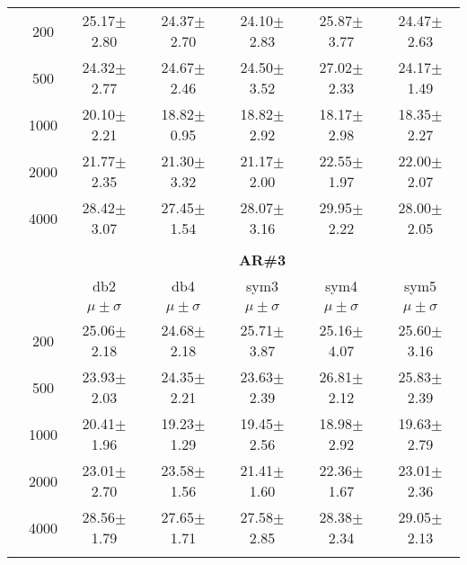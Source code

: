 \begin{table}[H]
\begin{tabular}{|c|c|c c c c c|}
\multicolumn{1}{|c|}{ \multirow{5}{*}{\rotatebox[origin=c]{90}{\textbf{Neurônios}}} }
&200	&25.17$\pm$2.80	&24.37$\pm$2.70	&24.10$\pm$2.83	&25.87$\pm$3.77	&24.47$\pm$2.63\\\cline{2-7}
&500	&24.32$\pm$2.77	&24.67$\pm$2.46	&24.50$\pm$3.52	&27.02$\pm$2.33	&24.17$\pm$1.49\\\cline{2-7}
&1000	&20.10$\pm$2.21	&18.82$\pm$0.95	&18.82$\pm$2.92	&18.17$\pm$2.98	&18.35$\pm$2.27\\\cline{2-7}
&2000	&21.77$\pm$2.35	&21.30$\pm$3.32	&21.17$\pm$2.00	&22.55$\pm$1.97	&22.00$\pm$2.07\\\cline{2-7}
&4000	&28.42$\pm$3.07	&27.45$\pm$1.54	&28.07$\pm$3.16	&29.95$\pm$2.22	&28.00$\pm$2.05



	


\\ \midrule
\multicolumn{7}{c}{}\\ 



\cline{3-7}
\multicolumn{2}{c|}{\multirow{3}{*}{}} & \multicolumn{5}{c|}{\textbf{AR\#3}}   \\\cline{3-7} 

\multicolumn{2}{c|}{}  & db2 & db4 & sym3 & sym4 & sym5 \\\cline{3-7}
\multicolumn{2}{c|}{}& $\mu \pm \sigma$ & $\mu \pm \sigma$ & $\mu \pm \sigma$ & $\mu \pm \sigma$ & $\mu \pm \sigma$ \\\hline

\multicolumn{1}{|c|}{ \multirow{5}{*}{\rotatebox[origin=c]{90}{\textbf{Neurônios}}} }
&200	&25.06$\pm$2.18	&24.68$\pm$2.18	&25.71$\pm$3.87	&25.16$\pm$4.07	&25.60$\pm$3.16\\\cline{2-7}
&500	&23.93$\pm$2.03 &24.35$\pm$2.21	&23.63$\pm$2.39	&26.81$\pm$2.12	&25.83$\pm$2.39\\\cline{2-7}
&1000	&20.41$\pm$1.96	&19.23$\pm$1.29	&19.45$\pm$2.56	&18.98$\pm$2.92	&19.63$\pm$2.79\\\cline{2-7}
&2000	&23.01$\pm$2.70	&23.58$\pm$1.56	&21.41$\pm$1.60	&22.36$\pm$1.67	&23.01$\pm$2.36\\\cline{2-7}
&4000	&28.56$\pm$1.79	&27.65$\pm$1.71	&27.58$\pm$2.85	&28.38$\pm$2.34	&29.05$\pm$2.13





\\\midrule 
\multicolumn{7}{c}{}\\ 




\end{tabular}
\end{table}
